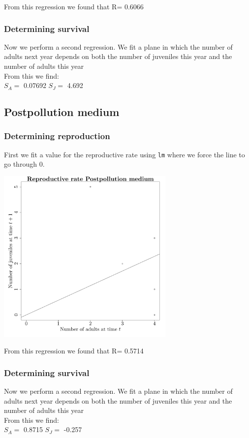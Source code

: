 \documentclass{article}\usepackage[]{graphicx}\usepackage[]{color}
\begin{document}
 From this regression we found that R= 0.6066 

\subsubsection{Determining survival}

Now we perform a second regression. We fit a plane in which the number of adults next year depends on both the number of juveniles this year and the number of adults this year\\From this we find:\\ 
$S_A=$ 0.07692 
$S_J=$ 4.692 
\subsection{ Postpollution medium }
\subsubsection{Determining reproduction}

First we fit a value for the reproductive rate using \texttt{lm} where we force the line to go through $0$. 



{\centering \includegraphics[width=0.65\textwidth]{figure/k59} 

}



 From this regression we found that R= 0.5714 

\subsubsection{Determining survival}

Now we perform a second regression. We fit a plane in which the number of adults next year depends on both the number of juveniles this year and the number of adults this year\\From this we find:\\ 
$S_A=$ 0.8715 
$S_J=$ -0.257 
\end{document}

